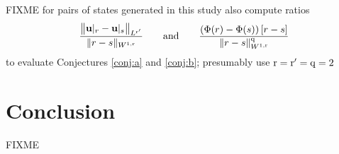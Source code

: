 \documentclass[hidelinks,onefignum,onetabnum,final]{siamart220329}  %
\newcommand{\bu}{\mathbf{u}}
\newcommand{\qq}{{\text{\textnormal{q}}}}
\newcommand{\rr}{{\text{\textnormal{r}}}}
\begin{document}
FIXME for pairs of states generated in this study also compute ratios
\begin{equation}
\frac{\big\|\bu|_r - \bu|_s\big\|_{L^{\rr'}}}{\|r-s\|_{W^{1,\rr}}} \qquad \text{and} \qquad \frac{\left(\Phi(r) - \Phi(s)\right)[r-s]}{\|r-s\|_{W^{1,\rr}}^\qq}
\end{equation}
to evaluate Conjectures \ref{conj:a} and \ref{conj:b}; presumably use $\rr=\rr'=\qq=2$


\section{Conclusion} \label{sec:conclusion}

FIXME




\end{document}
